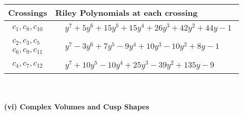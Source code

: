 \documentclass[1p]{elsarticle_modified}
\theoremstyle{definition}
\begin{document}
\begin{tabular}{m{50pt}|m{274pt}}
Crossings & \hspace{64pt}Riley Polynomials at each crossing \\
\hline $$\begin{aligned}c_{1},c_{8},c_{10}\end{aligned}$$&$\begin{aligned}
&y^7+5 y^6+15 y^5+15 y^4+26 y^3+42 y^2+44 y-1
\end{aligned}$\\
\hline $$\begin{aligned}c_{2},c_{3},c_{5}\\c_{6},c_{9},c_{11}\end{aligned}$$&$\begin{aligned}
&y^7-3 y^6+7 y^5-9 y^4+10 y^3-10 y^2+8 y-1
\end{aligned}$\\
\hline $$\begin{aligned}c_{4},c_{7},c_{12}\end{aligned}$$&$\begin{aligned}
&y^7+10 y^5-10 y^4+25 y^3-39 y^2+135 y-9
\end{aligned}$\\
\hline
\end{tabular}\\~\\
\newpage\flushleft \textbf{(vi) Complex Volumes and Cusp Shapes}
\end{document}
